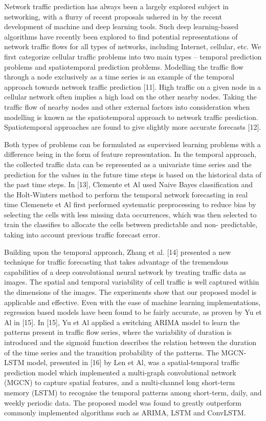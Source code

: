 \documentclass[conference]{IEEEtran}
\begin{document}
Network traffic prediction has always been a largely explored subject in networking, with a flurry of recent proposals ushered in by the recent development of machine and deep learning tools. Such deep learning-based algorithms have recently been explored to find potential representations of network traffic flows for all types of networks, including Internet, cellular, etc. We first categorize cellular traffic problems into two main types – temporal prediction problems and spatiotemporal prediction problems. Modelling the traffic flow through a node exclusively as a time series is an example of the temporal approach towards network traffic prediction [11]. High traffic on a given node in a cellular network often implies a high load on the other nearby nodes. Taking the traffic flow of nearby nodes and other external factors into consideration when modelling is known as the spatiotemporal approach to network traffic prediction. Spatiotemporal approaches are found to give slightly more accurate forecasts [12].

Both types of problems can be formulated as supervised learning problems with a difference being in the form of feature representation. In the temporal approach, the collected traffic data can be represented as a univariate time series and the prediction for the values in the future time steps is based on the historical data of the past time steps. In [13], Clemente et Al used Naive Bayes classification and the Holt-Winters method to perform the temporal network forecasting in real time Clemenete et Al first performed systematic preprocessing to reduce bias by selecting the cells with less missing data occurrences, which was then selected to train the classifies to allocate the cells between predictable and non- predictable, taking into account previous traffic forecast error. 

Building upon the temporal approach, Zhang et al. [14] presented a new technique for traffic forecasting that takes advantage of the tremendous capabilities of a deep convolutional neural network by treating traffic data as images. The spatial and temporal variability of cell traffic is well captured within the dimensions of the images. The experiments show that our proposed model is applicable and effective. Even with the ease of machine learning implementations, regression based models have been found to be fairly accurate, as proven by Yu et Al in [15]. In [15], Yu et Al applied a switching ARIMA model to learn the patterns present in traffic flow series, where the variability of duration is introduced and the sigmoid function describes the relation between the duration of the time series and the transition probability of the patterns. The MGCN-LSTM model, presented in [16] by Len et Al, was a spatial-temporal traffic prediction model which implemented a multi-graph convolutional network (MGCN) to capture spatial features, and a multi-channel long short-term memory (LSTM) to recognise the temporal patterns among short-term, daily, and weekly periodic data. The proposed model was found to greatly outperform commonly implemented algorithms such as ARIMA, LSTM and ConvLSTM.
\end{document}
